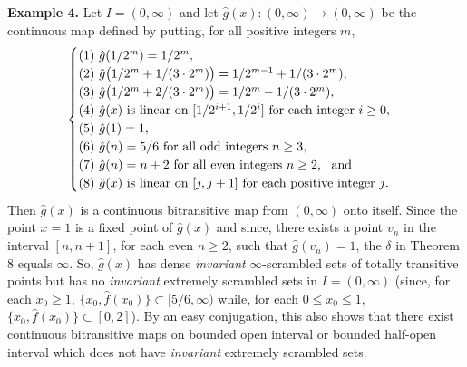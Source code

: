 \documentclass[12pt]{article}
\begin{document}
\noindent
{\bf Example 4.} Let $I = (0, \infty)$ and let $\hat g(x) : (0, \infty) \rightarrow (0, \infty)$ be the continuous map defined by putting, for all positive integers $m$, 
$$
\begin{cases}
(1) \,\, \hat g(1/2^m) = 1/2^m, \\
(2) \,\, \hat g\big(1/2^m + 1/(3 \cdot 2^m)\big) = 1/2^{m-1} + 1/(3 \cdot 2^m), \\
(3) \,\, \hat g\big(1/2^m + 2/(3 \cdot 2^m)\big) = 1/2^m - 1/(3 \cdot 2^m), \\
(4) \,\, \text{$\hat g(x)$ is linear on $[1/2^{i+1}, 1/2^i]$ for each integer $i \ge 0$}, \\
(5) \,\, \hat g(1) = 1, \\
(6) \,\, \text{$\hat g(n) = 5/6$ for all odd integers $n \ge 3$}, \\
(7) \,\, \text{$\hat g(n) = n+2$ for all even integers $n \ge 2$, \, and} \\ 
(8) \,\, \text{$\hat g(x)$ is linear on $[j, j +1]$ for each positive integer $j$}.\\  
\end{cases}
$$
Then $\hat g(x)$ is a continuous bitransitive map from $(0, \infty)$ onto itself.  Since the point $x = 1$ is a fixed point of $\hat g(x)$ and since, there exists a point $v_n$ in the interval $[n, n+1]$, for each even $n \ge 2$, such that $\hat g(v_n) = 1$, the $\delta$ in Theorem 8 equals $\infty$.  So, $\hat g(x)$ has dense {\it invariant} $\infty$-scrambled sets of totally transitive points but has no {\it invariant} extremely scrambled sets in $I = (0, \infty)$ \big(since, for each $x_0 \ge 1$, $\big\{ x_0, \hat f(x_0) \big\} \subset [5/6, \infty)$ while, for each $0 \le x_0 \le 1$, $\big\{ x_0, \hat f(x_0) \big\} \subset [0, 2]$\big).  By an easy conjugation, this also shows that there exist continuous bitransitive maps on bounded open interval or bounded half-open interval which does not have {\it invariant} extremely scrambled sets.  
\end{document}
